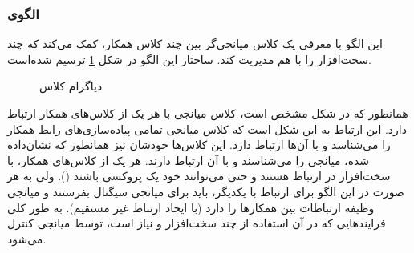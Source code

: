 \subsubsection{الگوی }
\label{HWMediatorSec}
\begin{RTL}
این الگو با معرفی یک کلاس میانجی‌گر بین چند کلاس همکار، کمک می‌کند که چند
سخت‌افزار را با هم مدیریت کند. ساختار این الگو در شکل \ref{HWMediatorClassDiag}
ترسیم شده‌است.
\end{RTL}
\begin{figure}[h!]
\centering
{}
\caption{دیاگرام کلاس }
\label{HWMediatorClassDiag}
\end{figure}
\begin{RTL}
همانطور که در شکل مشخص است، کلاس میانجی با هر یک از کلاس‌های همکار ارتباط دارد.
این ارتباط به این شکل است که کلاس میانجی تمامی پیاده‌سازی‌های رابط همکار را می‌شناسد
و با آن‌ها ارتباط دارد. این کلاس‌ها خودشان نیز همانطور که نشان‌داده شده،
میانجی را می‌شناسند و با آن ارتباط دارند.
هر یک از کلاس‌های همکار، با سخت‌افزار در ارتباط هستند و حتی می‌توانند خود یک پروکسی
باشند ().
ولی به هر صورت در این الگو برای ارتباط با یکدیگر، باید برای میانجی سیگنال
بفرستند و میانجی وظیفه ارتباطات بین همکارها را دارد (با ایجاد ارتباط غیر مستقیم).
به طور کلی فرایندهایی که در آن
استفاده از چند سخت‌افزار و نیاز است، توسط میانجی کنترل می‌شود.
\end{RTL}